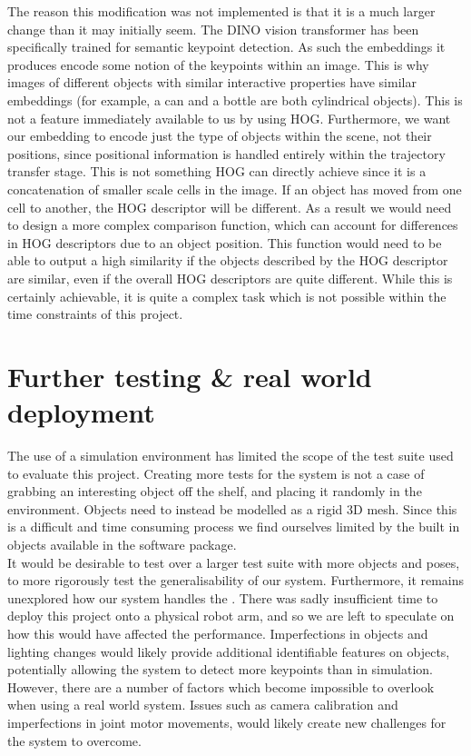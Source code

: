 The reason this modification was not implemented is that it is a much larger change than it may initially seem. The DINO vision transformer has been specifically trained for semantic keypoint detection. As such the embeddings it produces encode some notion of the keypoints within an image. This is why images of different objects with similar interactive properties have similar embeddings (for example, a can and a bottle are both cylindrical objects). This is not a feature immediately available to us by using HOG. Furthermore, we want our embedding to encode just the type of objects within the scene, not their positions, since positional information is handled entirely within the trajectory transfer stage. This is not something HOG can directly achieve since it is a concatenation of smaller scale cells in the image. If an object has moved from one cell to another, the HOG descriptor will be different. As a result we would need to design a more complex comparison function, which can account for differences in HOG descriptors due to an object position. This function would need to be able to output a high similarity if the objects described by the HOG descriptor are similar, even if the overall HOG descriptors are quite different. While this is certainly achievable, it is quite a complex task which is not possible within the time constraints of this project.

\section{Further testing \& real world deployment}
The use of a simulation environment has limited the scope of the test suite used to evaluate this project. Creating more tests for the system is not a case of grabbing an interesting object off the shelf, and placing it randomly in the environment. Objects need to instead be modelled as a rigid 3D mesh. Since this is a difficult and time consuming process we find ourselves limited by the built in objects available in the software package.\\

It would be desirable to test over a larger test suite with more objects and poses, to more rigorously test the generalisability of our system. Furthermore, it remains unexplored how our system handles the . There was sadly insufficient time to deploy this project onto a physical robot arm, and so we are left to speculate on how this would have affected the performance. Imperfections in objects and lighting changes would likely provide additional identifiable features on objects, potentially allowing the system to detect more keypoints than in simulation. However, there are a number of factors which become impossible to overlook when using a real world system. Issues such as camera calibration and imperfections in joint motor movements, would likely create new challenges for the system to overcome.